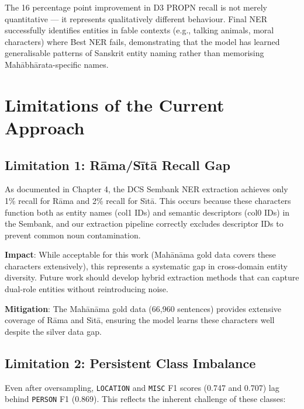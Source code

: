 The 16 percentage point improvement in D3 PROPN recall is not merely quantitative — it represents qualitatively different behaviour. Final NER successfully identifies entities in fable contexts (e.g., talking animals, moral characters) where Best NER fails, demonstrating that the model has learned generalisable patterns of Sanskrit entity naming rather than memorising Mahābhārata-specific \cite{mahabharata} names.

\section{Limitations of the Current Approach}

\subsection{Limitation 1: Rāma/Sītā Recall Gap}

As documented in Chapter 4, the DCS Sembank \cite{hellwig2010dcs, hellwig2025sembank} NER extraction achieves only 1\% recall for R\={a}ma and 2\% recall for S\={\i}t\={a}. This occurs because these characters function both as entity names (col1 IDs) and semantic descriptors (col0 IDs) in the Sembank, and our extraction pipeline correctly excludes descriptor IDs to prevent common noun contamination.

\textbf{Impact}: While acceptable for this work (Mahānāma gold data covers these characters extensively), this represents a systematic gap in cross-domain entity diversity. Future work should develop hybrid extraction methods that can capture dual-role entities without reintroducing noise.

\textbf{Mitigation}: The Mah\={a}n\={a}ma \cite{sarkar2025mahanama} gold data (66,960 sentences) provides extensive coverage of R\={a}ma and S\={\i}t\={a}, ensuring the model learns these characters well despite the silver data gap.

\subsection{Limitation 2: Persistent Class Imbalance}

Even after oversampling, \texttt{LOCATION} and \texttt{MISC} F1 scores (0.747 and 0.707) lag behind \texttt{PERSON} F1 (0.869). This reflects the inherent challenge of these classes:

